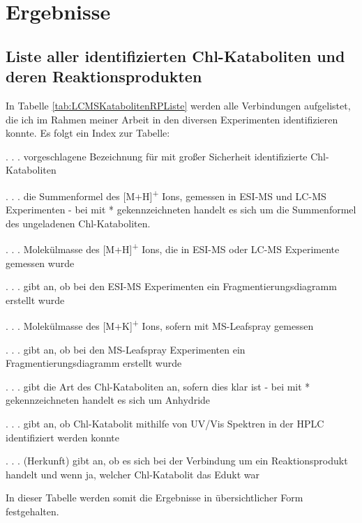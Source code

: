 \chapter{Ergebnisse}


\section{Liste aller identifizierten Chl-Kataboliten und deren Reaktionsprodukten}

In Tabelle \ref{tab:LCMSKatabolitenRPListe} werden alle Verbindungen aufgelistet, die ich im Rahmen meiner Arbeit in den diversen Experimenten identifizieren konnte. Es folgt ein Index zur Tabelle:

\begin{description}[align=right,labelwidth=3cm]
  \item [Chl-Katabolit] . . . vorgeschlagene Bezeichnung für mit großer Sicherheit identifizierte Chl-Kataboliten
  \item [Summenformel] . . . die Summenformel des [M+H]\textsuperscript{+} Ions, gemessen in ESI-MS und LC-MS Experimenten - bei mit * gekennzeichneten handelt es sich um die Summenformel des ungeladenen Chl-Kataboliten.
  \item [M+H] . . . Molekülmasse des [M+H]\textsuperscript{+} Ions, die in ESI-MS oder LC-MS Experimente gemessen wurde
  \item [Frag. I] . . . gibt an, ob bei den ESI-MS Experimenten ein Fragmentierungsdiagramm erstellt wurde
  \item [MS-Leafspray] . . . Molekülmasse des [M+K]\textsuperscript{+} Ions, sofern mit MS-Leafspray gemessen
  \item [Frag. II] . . . gibt an, ob bei den MS-Leafspray Experimenten ein Fragmentierungsdiagramm erstellt wurde
  \item [Typ] . . . gibt die Art des Chl-Kataboliten an, sofern dies klar ist - bei mit * gekennzeichneten handelt es sich um Anhydride
  \item [HPLC] . . . gibt an, ob Chl-Katabolit mithilfe von UV/Vis Spektren in der HPLC identifiziert werden konnte
  \item [H.] . . . (Herkunft) gibt an, ob es sich bei der Verbindung um ein Reaktionsprodukt handelt und wenn ja, welcher Chl-Katabolit das Edukt war
\end{description}

In dieser Tabelle werden somit die Ergebnisse in übersichtlicher Form festgehalten.


